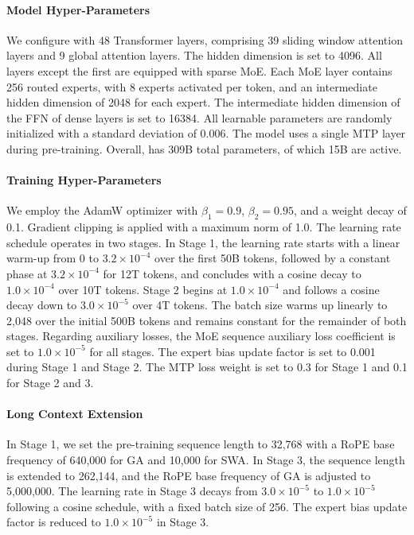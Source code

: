 \paragraph{Model Hyper-Parameters} We configure \mimoflash{} with 48 Transformer layers, comprising 39 sliding window attention layers and 9 global attention layers. The hidden dimension is set to 4096. All layers except the first are equipped with sparse MoE. Each MoE layer contains 256 routed experts, with 8 experts activated per token, and an intermediate hidden dimension of 2048 for each expert. The intermediate hidden dimension of the FFN of dense layers is set to 16384. All learnable parameters are randomly initialized with a standard deviation of 0.006. The model uses a single MTP layer during pre-training. Overall, \mimoflash{} has 309B total parameters, of which 15B are active.

\paragraph{Training Hyper-Parameters} 
We employ the AdamW optimizer with $\beta_1=0.9$, $\beta_2=0.95$, and a weight decay of 0.1. 
Gradient clipping is applied with a maximum norm of 1.0. 
The learning rate schedule operates in two stages.
In Stage 1, the learning rate starts with a linear warm-up from 0 to $3.2 \times 10^{-4}$ over the first 50B tokens, followed by a constant phase at $3.2 \times 10^{-4}$ for 12T tokens, and concludes with a cosine decay to $1.0 \times 10^{-4}$ over 10T tokens. Stage 2 begins at $1.0 \times 10^{-4}$ and follows a cosine decay down to $3.0 \times 10^{-5}$ over 4T tokens. The batch size warms up linearly to 2,048 over the initial 500B tokens and remains constant for the remainder of both stages.
Regarding auxiliary losses, the MoE sequence auxiliary loss coefficient is set to $1.0 \times 10^{-5}$ for all stages. The expert bias update factor is set to 0.001 during Stage 1 and Stage 2. The MTP loss weight is set to 0.3 for Stage 1 and 0.1 for Stage 2 and 3.


\paragraph{Long Context Extension} 

In Stage 1, we set the pre-training sequence length to 32,768 with a RoPE base frequency of 640,000 for GA and 10,000 for SWA. In Stage 3, the sequence length is extended to 262,144, and the RoPE base frequency of GA is adjusted to 5,000,000. The learning rate in Stage 3 decays from $3.0 \times 10^{-5}$ to $1.0 \times 10^{-5}$ following a cosine schedule, with a fixed batch size of 256. The expert bias update factor is reduced to $1.0 \times 10^{-5}$ in Stage 3.




